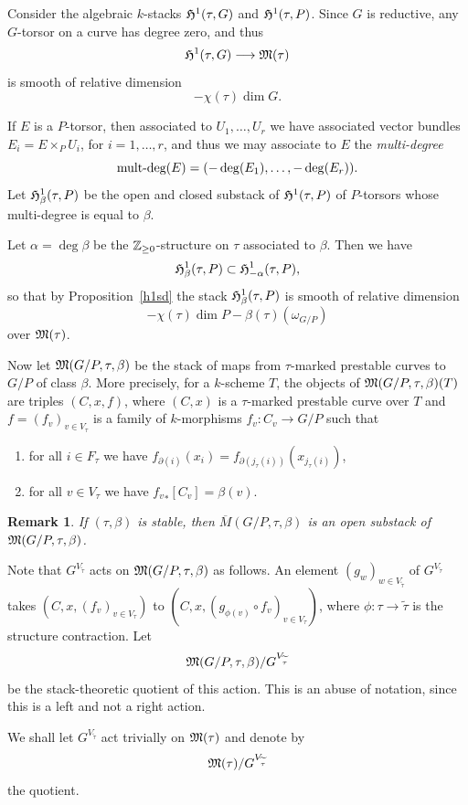\documentclass{article}
\newtheorem{rmkp}{Remark}\renewcommand{\thermkp}{}
\newenvironment{rmk}{\begin{rmkp}\rm}{\end{rmkp}}
\renewcommand{\tilde}{\widetilde}
\newcommand{\lst}{_{\ast}}
\newcommand{\MM}{{\frak M}}
\newcommand{\HH}{{\frak H}}
\newcommand{\zz}{{\Bbb Z}}
\newcommand{\del}{\partial}
\newcommand{\multdeg}{\mathop{\rm\textstyle \mbox{mult-deg}}\nolimits}
\newcommand{\comp}{\mathbin{{\scriptstyle\circ}}}
\newcommand{\ol}{\overline}
\renewcommand{\t}{_{\tau}}
\begin{document}
Consider the algebraic $k$-stacks $\HH^1(\tau,G)$ and
$\HH^1(\tau,P)$. Since $G$ is reductive, any $G$-torsor
on a curve has degree zero, and thus
\[\HH^1(\tau,G)\longrightarrow\MM(\tau)\]
is smooth of relative dimension
\[-\chi(\tau)\dim G.\]

If $E$ is a $P$-torsor, then associated to $U_1,\ldots,U_r$ we have
associated vector bundles $E_i=E\times_PU_i$, for $i=1,\ldots,r$, and
thus we may associate to $E$ the {\em multi-degree }
\[\multdeg(E)=(-\deg(E_1),\ldots,-\deg(E_r)).\]
Let $\HH^1_{\beta}(\tau,P)$ be the open and closed
substack of $\HH^1(\tau,P)$ of $P$-torsors whose
multi-degree is equal to $\beta$.

Let $\alpha=\deg\beta$ be the $\zz_{\geq0}$-structure on $\tau$
associated to $\beta$. Then we have
\[\HH^1_{\beta}(\tau,P)
\subset\HH^1_{-\alpha}(\tau,P),\]
so that by Proposition~\ref{h1sd} the stack
$\HH^1_{\beta}(\tau,P)$ is smooth of relative dimension
\[-\chi(\tau)\dim P-\beta(\tau)(\omega_{G/P})\]
over $\MM(\tau)$.

Now let $\MM(G/P,\tau,\beta)$ be the stack of maps from $\tau$-marked
prestable curves to $G/P$ of class $\beta$. More precisely, for a
$k$-scheme $T$, the objects of $\MM(G/P,\tau,\beta)(T)$ are triples
$(C,x,f)$, where $(C,x)$ is a $\tau$-marked prestable curve over $T$
and $f=(f_v)_{v\in V\t}$ is a family of $k$-morphisms
$f_v:C_v\rightarrow G/P$ such that
\begin{enumerate}
\item for all $i\in F\t$ we have
$f_{\del(i)}(x_i)=f_{\del(j\t(i))}(x_{j\t(i)})$,
\item for all $v\in V\t$ we have ${f_v}\lst[C_v]=\beta(v)$.
\end{enumerate}

\begin{rmk}
If $(\tau,\beta)$ is stable, then $\ol{M}(G/P,\tau,\beta)$ is an open
substack of $\MM(G/P,\tau,\beta)$.
\end{rmk}

Note that $G^{V_{\tilde{\tau}}}$ acts on $\MM(G/P,\tau,\beta)$ as
follows. An element $(g_w)_{w\in V_{\tilde{\tau}}}$ of
$G^{V_{\tilde{\tau}}}$ takes $(C,x,(f_v)_{v\in V\t})$ to
$(C,x,(g_{\phi(v)}\comp f_v)_{v\in V\t})$, where
$\phi:\tau\rightarrow\tilde{\tau}$ is the structure contraction.  Let
$$\MM(G/P,\tau,\beta)/G^{V_{\tilde{\tau}}}$$ be the
stack-theoretic quotient of this action. This is an abuse of notation,
since this is a left and not a right action.

We shall let $G^{V_{\tilde{\tau}}}$ act trivially on $\MM(\tau)$
and denote by
\[\MM(\tau)/G^{V_{\tilde{\tau}}}\]
the quotient.
\end{document}

